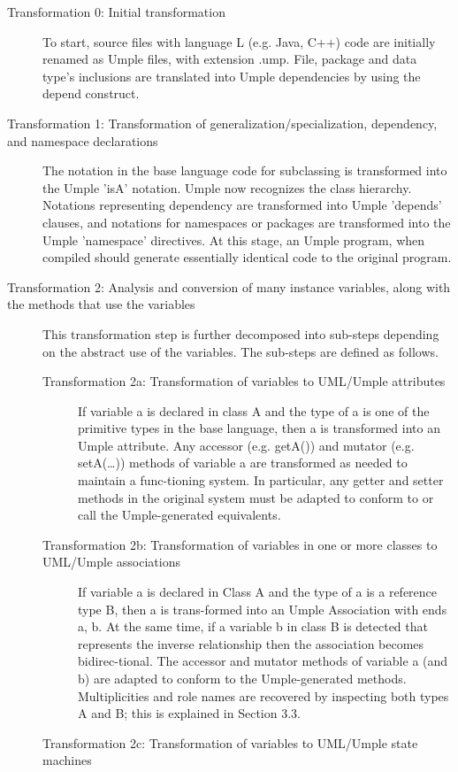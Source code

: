 \begin{description} 
\item[Transformation 0: Initial transformation] 
To start, source files with language L (e.g. Java, C++) code are initially renamed as Umple files, with extension .ump. File, package and data type's inclusions are translated into Umple dependencies by using the depend construct. 
\item [Transformation 1: Transformation of generalization/specialization, dependency, and namespace declarations]
The notation in the base language code for subclassing is transformed into the Umple 'isA' notation. Umple now recognizes the class hierarchy.  Notations representing dependency are transformed into Umple 'depends' clauses, and notations for namespaces or packages are transformed into the Umple 'namespace' directives. At this stage, an Umple program, when compiled should generate essentially identical code to the original program.
\item [Transformation 2: Analysis and conversion of many instance variables, along with the methods that use the variables]
This transformation step is further decomposed into sub-steps depending on the abstract use of the variables. The sub-steps are defined as follows.
   \begin{description}
\item [Transformation 2a: Transformation of variables to UML/Umple attributes]
If variable a is declared in class A and the type of a is one of the primitive types in the base language, then a is transformed into an Umple attribute. Any accessor (e.g. getA()) and mutator (e.g. setA(…)) methods of variable a are transformed as needed to maintain a func-tioning system. In particular, any getter and setter methods in the original system must be adapted to conform to or call the Umple-generated equivalents.
\item [Transformation 2b: Transformation of variables in one or more classes to UML/Umple associations]
If variable a is declared in Class A and the type of a is a reference type B, then a is trans-formed into an Umple Association with ends {a, b}. At the same time, if a variable b in class B is detected that represents the inverse relationship then the association becomes bidirec-tional. The accessor and mutator methods of variable a (and b) are adapted to conform to the Umple-generated methods. Multiplicities and role names are recovered by inspecting both types A and B; this is explained in Section 3.3. 
\item [Transformation 2c: Transformation of variables to UML/Umple state machines]

\end{description}
\end{description}
